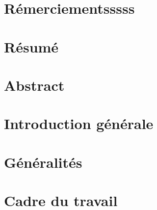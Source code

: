 \documentclass[
		oneside,numbers=noenddot,headinclude,
	 	footinclude=true,cleardoublepage=empty,
		dottedtoc,paper=a4,fontsize=12pt,
        utf8,
]{scrreport}
\begin{document}
    \setcounter{chapter}{-1}
    

    \newpage
    

    \chapter*{}\label{cha:epigraph}
    

    \chapter*{}\label{cha:ddck}
    

    \chapter*{Rémerciementsssss}\label{cha:remerciements}
    

    \chapter*{Résumé}\label{cha:resume}
    

    \chapter*{Abstract}\label{cha:abstract}
    

    \tableofcontents

    \listoffigures

    \listoftables

    \chapter{Introduction générale}\label{cha:introduction-generale}
    

    \chapter{Généralités}\label{cha:generalites}
    

    \chapter{Cadre du travail}
    
\end{document}
